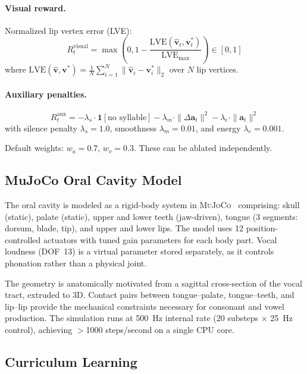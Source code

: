\documentclass[11pt, a4paper]{article}
\newcommand{\mujoco}{\textsc{MuJoCo}}
\begin{document}
\paragraph{Visual reward.} Normalized lip vertex error (LVE):
\begin{equation}
    R^{\text{visual}}_t = \max\left(0, 1 - \frac{\text{LVE}(\hat{\mathbf{v}}_t, \mathbf{v}^*_t)}{\text{LVE}_{\max}}\right) \in [0, 1]
\end{equation}
where $\text{LVE}(\hat{\mathbf{v}}, \mathbf{v}^*) = \frac{1}{N}\sum_{i=1}^{N}\|\hat{\mathbf{v}}_i - \mathbf{v}^*_i\|_2$ over $N$ lip vertices.

\paragraph{Auxiliary penalties.}
\begin{equation}
    R^{\text{aux}}_t = -\lambda_s \cdot \mathbf{1}[\text{no syllable}] - \lambda_m \cdot \|\Delta \mathbf{a}_t\|^2 - \lambda_e \cdot \|\mathbf{a}_t\|^2
\end{equation}
with silence penalty $\lambda_s = 1.0$, smoothness $\lambda_m = 0.01$, and energy $\lambda_e = 0.001$.

Default weights: $w_a = 0.7$, $w_v = 0.3$. These can be ablated independently.

\subsection{MuJoCo Oral Cavity Model}
\label{sec:mujoco_model}

The oral cavity is modeled as a rigid-body system in \mujoco{}~\cite{todorov2012mujoco} comprising: skull (static), palate (static), upper and lower teeth (jaw-driven), tongue (3 segments: dorsum, blade, tip), and upper and lower lips. The model uses 12 position-controlled actuators with tuned gain parameters for each body part. Vocal loudness (DOF~13) is a virtual parameter stored separately, as it controls phonation rather than a physical joint.

The geometry is anatomically motivated from a sagittal cross-section of the vocal tract, extruded to 3D. Contact pairs between tongue--palate, tongue--teeth, and lip--lip provide the mechanical constraints necessary for consonant and vowel production. The simulation runs at 500~Hz internal rate (20 substeps $\times$ 25~Hz control), achieving $>$1000 steps/second on a single CPU core.

\subsection{Curriculum Learning}
\label{sec:curriculum}
\end{document}
